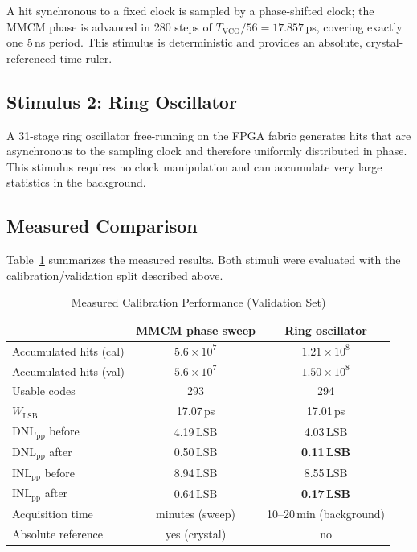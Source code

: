\documentclass[journal]{IEEEtran}
\begin{document}
A hit synchronous to a fixed clock is sampled by a phase-shifted clock; the
MMCM phase is advanced in 280 steps of $T_{\mathrm{VCO}}/56 = 17.857$\,ps,
covering exactly one 5\,ns period. This stimulus is deterministic and provides
an absolute, crystal-referenced time ruler.

\subsection{Stimulus 2: Ring Oscillator}

A 31-stage ring oscillator free-running on the FPGA fabric generates hits that
are asynchronous to the sampling clock and therefore uniformly distributed in
phase. This stimulus requires no clock manipulation and can accumulate very
large statistics in the background.

\subsection{Measured Comparison}

Table~\ref{tab:calcmp} summarizes the measured results. Both stimuli were
evaluated with the calibration/validation split described above.

\begin{table}[htbp]
\caption{Measured Calibration Performance (Validation Set)}
\label{tab:calcmp}
\centering
\begin{tabular}{lcc}
\toprule
 & MMCM phase sweep & Ring oscillator \\
\midrule
Accumulated hits (cal) & $5.6\times10^{7}$ & $1.21\times10^{8}$ \\
Accumulated hits (val) & $5.6\times10^{7}$ & $1.50\times10^{8}$ \\
Usable codes & 293 & 294 \\
$W_{\mathrm{LSB}}$ & 17.07\,ps & 17.01\,ps \\
\midrule
DNL$_{\mathrm{pp}}$ before & 4.19\,LSB & 4.03\,LSB \\
DNL$_{\mathrm{pp}}$ after  & 0.50\,LSB & \textbf{0.11\,LSB} \\
INL$_{\mathrm{pp}}$ before & 8.94\,LSB & 8.55\,LSB \\
INL$_{\mathrm{pp}}$ after  & 0.64\,LSB & \textbf{0.17\,LSB} \\
\midrule
Acquisition time & minutes (sweep) & 10--20\,min (background) \\
Absolute reference & yes (crystal) & no \\
\bottomrule
\end{tabular}
\end{table}
\end{document}
